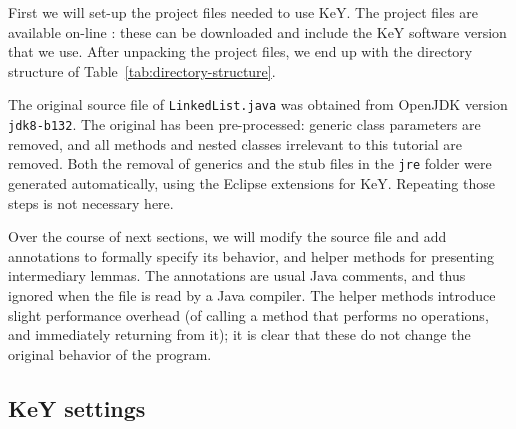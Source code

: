 \documentclass[runningheads]{llncs}
\theoremstyle{remark}
\begin{document}
First we will set-up the project files needed to use KeY. The project files are available on-line : these can be downloaded and include the KeY software version that we use. After unpacking the project files, we end up with the directory structure of Table~\ref{tab:directory-structure}.

The original source file of \texttt{LinkedList.java} was obtained from OpenJDK version \texttt{jdk8-b132}. The original has been pre-processed: generic class parameters are removed, and all methods and nested classes irrelevant to this tutorial are removed. Both the removal of generics and the stub files in the \texttt{jre} folder were generated automatically, using the Eclipse extensions for KeY. Repeating those steps is not necessary here.

Over the course of next sections, we will modify the source file and add annotations to formally specify its behavior, and helper methods for presenting intermediary lemmas. The annotations are usual Java comments, and thus ignored when the file is read by a Java compiler. The helper methods introduce slight performance overhead (of calling a method that performs no operations, and immediately returning from it); it is clear that these do not change the original behavior of the program.

\subsection{KeY settings}
\end{document}
